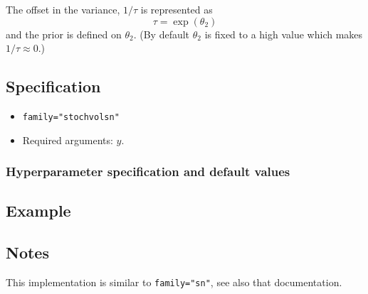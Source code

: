 \documentclass[a4paper,11pt]{article}
\begin{document}
The offset in the variance, $1/\tau$ is represented as
\begin{displaymath}
    \tau = \exp(\theta_2)
\end{displaymath}
and the prior is defined on $\theta_2$. (By default $\theta_2$ is
fixed to a high value which makes $1/\tau \approx 0$.)

\subsection*{Specification}

\begin{itemize}
\item \texttt{family="stochvolsn"}
\item Required arguments: $y$.
\end{itemize}

\subsubsection*{Hyperparameter specification and default values}



\subsection*{Example}



\subsection*{Notes}

This implementation is similar to \texttt{family="sn"}, see also that
documentation.
\end{document}

